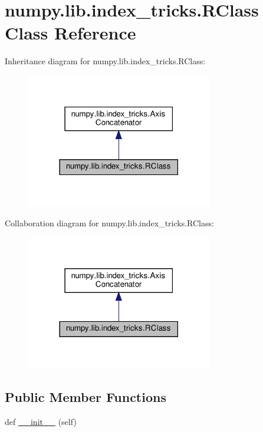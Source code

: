 \hypertarget{classnumpy_1_1lib_1_1index__tricks_1_1RClass}{}\section{numpy.\+lib.\+index\+\_\+tricks.\+R\+Class Class Reference}
\label{classnumpy_1_1lib_1_1index__tricks_1_1RClass}


Inheritance diagram for numpy.\+lib.\+index\+\_\+tricks.\+R\+Class\+:
\nopagebreak
\begin{figure}[H]
\begin{center}
\leavevmode
\includegraphics[width=230pt]{classnumpy_1_1lib_1_1index__tricks_1_1RClass__inherit__graph}
\end{center}
\end{figure}


Collaboration diagram for numpy.\+lib.\+index\+\_\+tricks.\+R\+Class\+:
\nopagebreak
\begin{figure}[H]
\begin{center}
\leavevmode
\includegraphics[width=230pt]{classnumpy_1_1lib_1_1index__tricks_1_1RClass__coll__graph}
\end{center}
\end{figure}
\subsection*{Public Member Functions}
\begin{DoxyCompactItemize}
\item 
def \hyperlink{classnumpy_1_1lib_1_1index__tricks_1_1RClass_ab0bfa0de53b310c803b10d035c052e66}{\+\_\+\+\_\+init\+\_\+\+\_\+} (self)
\end{DoxyCompactItemize}

